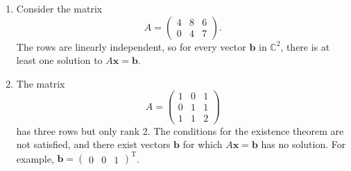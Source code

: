 \begin{enumerate}
    \item Consider the matrix 
    \[
    A = \begin{pmatrix}
    4 & 8 & 6 \\
    0 & 4 & 7
    \end{pmatrix}.
    \]
    The rows are linearly independent, so for every vector \( \mathbf{b} \) in \( \mathbb{C}^2 \), there is at least one solution to \( A\mathbf{x} = \mathbf{b} \).

    \item The matrix
    \[
    A = \begin{pmatrix}
    1 & 0 & 1 \\
    0 & 1 & 1 \\
    1 & 1 & 2
    \end{pmatrix}
    \]
    has three rows but only rank 2. The conditions for the existence theorem are not satisfied, and there exist vectors \( \mathbf{b} \) for which \( A\mathbf{x} = \mathbf{b} \) has no solution. For example, \( \mathbf{b} = \begin{pmatrix} 0 & 0 & 1 \end{pmatrix}^\text{T} \).


\end{enumerate}
